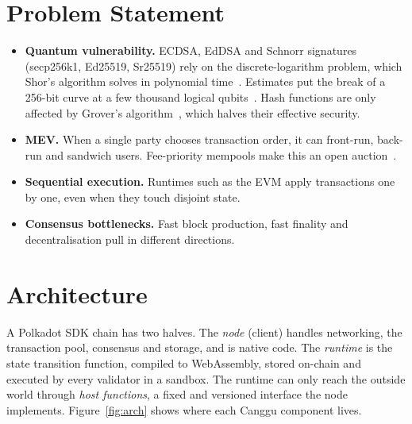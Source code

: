 \documentclass[11pt]{article}
\theoremstyle{definition}
\theoremstyle{remark}
\begin{document}
\section{Problem Statement}

\begin{itemize}[leftmargin=*]
  \item \textbf{Quantum vulnerability.} ECDSA, EdDSA and Schnorr signatures (secp256k1, Ed25519,
        Sr25519) rely on the discrete-logarithm problem, which Shor's algorithm solves in polynomial
        time~\cite{shor1994}. Estimates put the break of a 256-bit curve at a few thousand logical
        qubits~\cite{roetteler2017}. Hash functions are only affected by Grover's
        algorithm~\cite{grover1996}, which halves their effective security.
  \item \textbf{MEV.} When a single party chooses transaction order, it can front-run, back-run and
        sandwich users. Fee-priority mempools make this an open auction~\cite{flashboys}.
  \item \textbf{Sequential execution.} Runtimes such as the EVM apply transactions one by one, even
        when they touch disjoint state.
  \item \textbf{Consensus bottlenecks.} Fast block production, fast finality and decentralisation
        pull in different directions.
\end{itemize}

\section{Architecture}
\label{sec:arch}

A Polkadot SDK chain has two halves. The \emph{node} (client) handles networking, the transaction
pool, consensus and storage, and is native code. The \emph{runtime} is the state transition function,
compiled to WebAssembly, stored on-chain and executed by every validator in a sandbox. The runtime
can only reach the outside world through \emph{host functions}, a fixed and versioned interface
the node implements. Figure~\ref{fig:arch} shows where each Canggu component lives.
\end{document}
